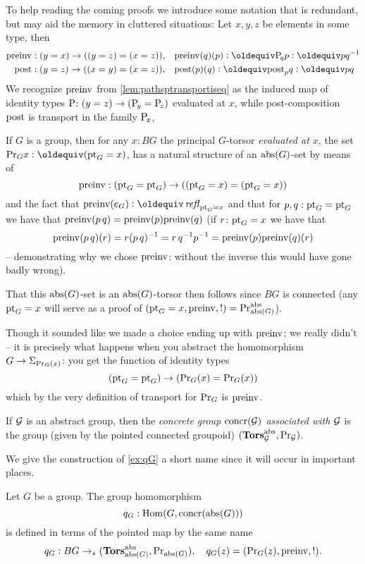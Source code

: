 To help reading the coming proofs we introduce some notation that is redundant, but may aid the memory in cluttered situations:  Let $x,y,z$ be elements in some type, then
\begin{align*}
  \preinv:(y=x)\to ((y=z)=(x=z)),\quad&\preinv(q)(p)\defequi\pathsp qp\defequi pq^{-1}\\
  \post:(y=z)\to ((x=y)=(x=z)),\quad&\post(p)(q)\defequi\post_pq\defequi pq\\
\end{align*}
We recognize $\mathrm{preinv}$ from \cref{lem:pathsptransportiseq} as the induced map of identity types $\mathrm{P}_{\!}\colon (y=z)\to(\mathrm{P}_{\!y}=\mathrm{P}_{\!z})$ evaluated at $x$, while post-composition $\mathrm{post}$ is transport in the family $\mathrm{P}_{\!x}$, 


\begin{example}\label{ex:qG}
  If $G$ is a group, then for any $x:BG$ the principal $G$-torsor \emph{evaluated at $x$}, \ie the set $\princ Gx\defequi(\pt_G=x)$, has a natural structure of an $\mathrm{abs}(G)$-set by means of 
$$\mathrm{preinv}:(\mathrm{pt}_G=\mathrm{pt}_G)\to ((\mathrm{pt}_G=x)=(\mathrm{pt}_G=x))$$ and the fact that $\preinv(e_G)\defequi\refl{\pt_G=x}$ and that for $p,q:\mathrm{pt}_G=\mathrm{pt}_G$ we have that  $\mathrm{preinv}(p\,q)=\mathrm{preinv}(p)\mathrm{preinv}(q)$ (\ie if $r\colon \mathrm{pt}_G=x$ we have that 
$$\mathrm{preinv}(p\, q)(r)=r(p\,q)^{-1}=r\,q^{-1}p^{-1}=\mathrm{preinv}(p)\mathrm{preinv}(q)(r)$$  -- demonstrating why we chose $\mathrm{preinv}$: without the inverse this would have gone badly wrong).  

That this $\mathrm{abs}(G)$-set is an $\mathrm{abs}(G)$-torsor then follows since $BG$ is connected (any $\mathrm{pt}_G=x$ will serve as a proof of $(\mathrm{pt}_G=x,\mathrm{preinv},!)=\mathrm{Pr}_{{\mathrm{abs}(G)}}^{\mathrm{abs}}$).

Though it sounded like we made a choice ending up with $\mathrm{preinv}$; we really didn't -- it is precisely what happens when you abstract the homomorphism $G\to\Sigma_{\mathrm{Pr}_{{G}}(x)}$: 
you get the function of identity types 
$$(\mathrm{pt}_G=\mathrm{pt}_G)\to (\mathrm{Pr}_{{G}}(x)=\mathrm{Pr}_{{G}}(x))$$ 
which by the very definition of transport for $\mathrm{Pr}_{{G}}$ is $\mathrm{preinv}$. 
\end{example}

\begin{definition}
  If ${\mathcal G}$ is an abstract group, then the \emph{concrete group $\mathrm{concr}({\mathcal G})$ associated with ${\mathcal G}$} is the group (given by the pointed connected groupoid) $(\mathbf{Tors}_{\mathcal G}^{\mathrm{abs}},\mathrm{Pr}_{{\mathcal G}})$.
\end{definition}
We give the construction of \cref{ex:qG} a short name since it will occur in important places.
\begin{definition}
  Let $G$ be a group.
  The group homomorphism 
  $$q_G:\mathrm{Hom}(G,\mathrm{concr}(\mathrm{abs}(G)))$$
  is defined in terms of the pointed map by the same name
$$q_G:BG\to_* (\mathbf{Tors}^{\mathrm{abs}}_{\mathrm{abs}(G)},\mathrm{Pr}_{{\mathrm{abs}(G)}}),\quad q_G(z)=(\mathrm{Pr}_{{G}}(z),\mathrm{preinv},!).$$
\end{definition}

